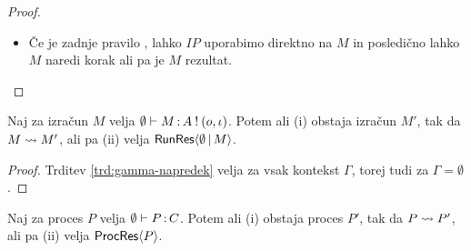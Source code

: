 \begin{proof}
\begin{itemize}
		\item Če je zadnje pravilo , lahko $IP$ uporabimo direktno na $M$ in posledično lahko $M$ naredi korak ali pa je $M$ rezultat.
			
	\end{itemize}
	
\end{proof}


\begin{posledica}[o napredku]\label{pos:prazen-napredek}
	Naj za izračun $M$ velja $\emptyset \vdash M \mathinner{:} A \mathbin{!} (o, \iota)$. Potem ali (i) obstaja izračun $M'$, tak da $M \leadsto M'$, ali pa (ii) velja $\mathsf{RunRes}\langle\emptyset \,\vert\, M\rangle$.
\end{posledica}

\begin{proof}
	Trditev \ref{trd:gamma-napredek} velja za vsak kontekst $\Gamma$, torej tudi za $\Gamma = \emptyset$.
\end{proof}


\begin{izrek}[o napredku]\label{izr:napredek}
	Naj za proces $P$ velja $\emptyset \vdash P \mathinner{:} C$. Potem ali (i) obstaja proces $P'$, tak da $P \leadsto P'$, ali pa (ii) velja $\mathsf{ProcRes}\langle P \rangle$.
\end{izrek}

